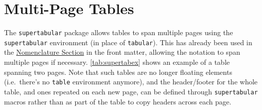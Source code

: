 
\section{Multi-Page Tables}\label{sec:multipagetables}

The \texttt{supertabular} package allows tables to span multiple pages using
the \texttt{supertabular} environment (in place of \texttt{tabular}). This has
already been used in the \hyperref[fr:notation]{Nomenclature Section} in the
front matter, allowing the notation to span multiple pages if necessary.
\autoref{tab:supertabex} shows an example of a table spanning two pages. Note
that such tables are no longer floating elements (i.e.~there's no
\texttt{table} environment anymore), and the header/footer for the whole
table, and ones repeated on each new page, can be defined through
\texttt{supertabular} macros rather than as part of the table to copy headers
across each page.

